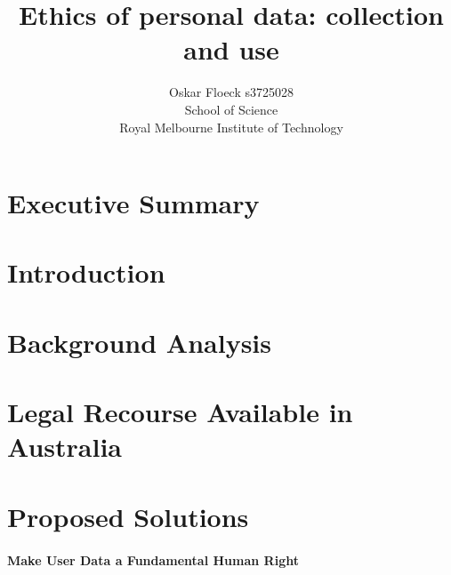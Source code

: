 \documentclass[12pt,a4paper]{article}
\begin{document}
\title{Ethics of personal data: collection and use}

\author{
Oskar Floeck s3725028\\
School of Science\\
Royal Melbourne Institute of Technology}

\maketitle

\tableofcontents

\section{Executive Summary}




\section{Introduction}




\section{Background Analysis}




\section{Legal Recourse Available in Australia}




\section{Proposed Solutions}

\paragraph{Make User Data a Fundamental Human Right}
\end{document}
